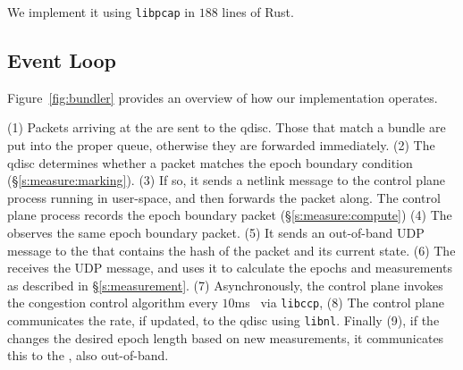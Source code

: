 
\Para{\capoutbox} We implement it using \texttt{libpcap} in $188$ lines of Rust. 

\subsection{\name Event Loop}\label{s:impl:loop}
Figure~\ref{fig:bundler} provides an overview of how our \name implementation operates.

(1) Packets arriving at the \inbox are sent to the qdisc. Those that match a bundle are put into the proper queue, 
otherwise they are forwarded immediately. (2) The qdisc determines whether a packet matches the epoch boundary
condition (\S\ref{s:measure:marking}). (3) If so, it sends a netlink message to the control plane process running in user-space, and then forwards the packet along. The control plane process records the epoch boundary packet (\S\ref{s:measure:compute}) (4) The \outbox observes the same epoch boundary packet. (5) It sends an out-of-band UDP message to the \reword{\inbox} that contains the hash of the packet and its current state. (6) The \reword{\inbox} receives the UDP message, and uses it to calculate the epochs and measurements as described 
in \S\ref{s:measurement}. 
(7) Asynchronously, the \inbox control plane invokes the congestion control algorithm every $10$ms~\cite{ccp}
via \texttt{libccp},
(8) The \inbox control plane communicates the rate, if updated, to the qdisc
using \texttt{libnl}. 
Finally (9), if the \inbox changes the desired epoch length based on new measurements, it communicates this to the \outbox, also out-of-band.

